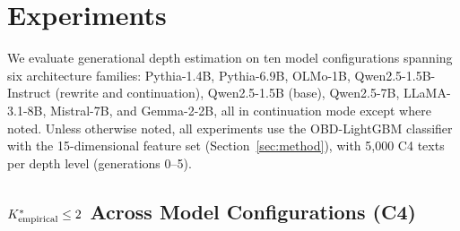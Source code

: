 \section{Experiments}
\label{sec:experiments}

We evaluate generational depth estimation on ten model configurations spanning six architecture families:
Pythia-1.4B, Pythia-6.9B, OLMo-1B, Qwen2.5-1.5B-Instruct (rewrite and continuation), Qwen2.5-1.5B (base), Qwen2.5-7B, LLaMA-3.1-8B, Mistral-7B, and Gemma-2-2B, all in continuation mode except where noted.
Unless otherwise noted, all experiments use the OBD-LightGBM classifier with the 15-dimensional feature set (Section~\ref{sec:method}), with 5{,}000 C4 texts per depth level (generations 0--5).

\subsection{${K^*_{\text{empirical}}} \leq 2$ Across Model Configurations (C4)}
\label{sec:kstar_boundary}

